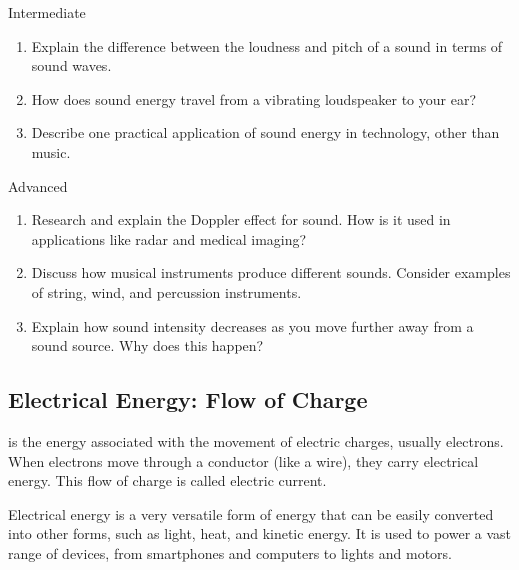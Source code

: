 \begin{tieredquestions}{Intermediate}
\begin{enumerate}
    \item Explain the difference between the loudness and pitch of a sound in terms of sound waves.
    \item How does sound energy travel from a vibrating loudspeaker to your ear?
    \item Describe one practical application of sound energy in technology, other than music.
\end{enumerate}
\end{tieredquestions}

\begin{tieredquestions}{Advanced}
\begin{enumerate}
    \item Research and explain the Doppler effect for sound. How is it used in applications like radar and medical imaging?
    \item Discuss how musical instruments produce different sounds. Consider examples of string, wind, and percussion instruments.
    \item Explain how sound intensity decreases as you move further away from a sound source. Why does this happen?
\end{enumerate}
\end{tieredquestions}


\subsection{Electrical Energy: Flow of Charge}

 is the energy associated with the movement of electric charges, usually electrons.  When electrons move through a conductor (like a wire), they carry electrical energy.  This flow of charge is called electric current.


Electrical energy is a very versatile form of energy that can be easily converted into other forms, such as light, heat, and kinetic energy.  It is used to power a vast range of devices, from smartphones and computers to lights and motors.

